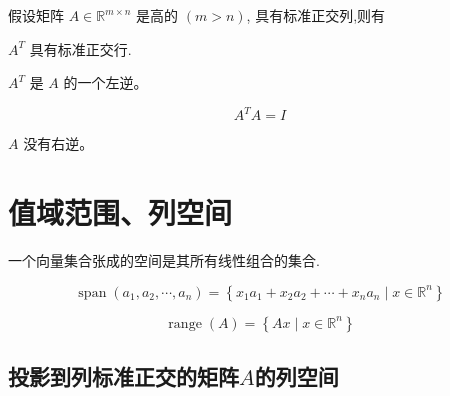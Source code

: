 \begin{theorem}
    假设矩阵 $ A \in \mathbb{R}^{m \times n} $ 是高的 $ ({m}>{n}) $, 具有标准正交列,则有

    $ A^{T} $ 具有标准正交行.
\end{theorem}

\begin{theorem}
    $ A^{T} $ 是 $ A $ 的一个左逆。

    $$A^T A =I$$
\end{theorem}

\begin{theorem}
    $ A $ 没有右逆。
\end{theorem}

\section{值域范围、列空间}

\begin{definition}[向量集合张成的空间]
    一个向量集合张成的空间是其所有线性组合的集合.

    $$ \operatorname{span}\left(a_{1}, a_{2}, \cdots, a_{n}\right)=\left\{x_{1} a_{1}+x_{2} a_{2}+\cdots+x_{n} a_{n} \mid x \in \mathbb{R}^{n}\right\} $$
\end{definition}

\begin{definition}
    $$ \operatorname{range}(A)=\left\{A x \mid x \in \mathbb{R}^{n}\right\} $$
\end{definition}

\subsection{投影到列标准正交的矩阵$A$的列空间}
\label{chap:projection-onto-a}


